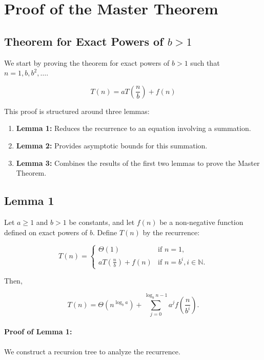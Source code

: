 \section{Proof of the Master Theorem}

\subsection{Theorem for Exact Powers of \(b > 1\)}

We start by proving the theorem for exact powers of \(b > 1\) such that \(n = 1, b, b^2, \ldots\).

\[
T(n) = aT\left(\frac{n}{b}\right) + f(n)
\]

This proof is structured around three lemmas:

\begin{enumerate}
    \item \textbf{Lemma 1:} Reduces the recurrence to an equation involving a summation.
    \item \textbf{Lemma 2:} Provides asymptotic bounds for this summation.
    \item \textbf{Lemma 3:} Combines the results of the first two lemmas to prove the Master Theorem.
\end{enumerate}

\subsection{Lemma 1}

Let \(a \geq 1\) and \(b > 1\) be constants, and let \(f(n)\) be a non-negative function defined on exact powers of \(b\). Define \(T(n)\) by the recurrence:

\[
T(n) =
\begin{cases} 
\Theta(1) & \text{if } n = 1, \\
aT\left(\frac{n}{b}\right) + f(n) & \text{if } n = b^i, i \in \mathbb{N}.
\end{cases}
\]

Then, 

\[
T(n) = \Theta\left(n^{\log_b a}\right) + \sum_{j=0}^{\log_b n - 1} a^j f\left(\frac{n}{b^i}\right).
\]

\paragraph{Proof of Lemma 1:}
We construct a recursion tree to analyze the recurrence.


